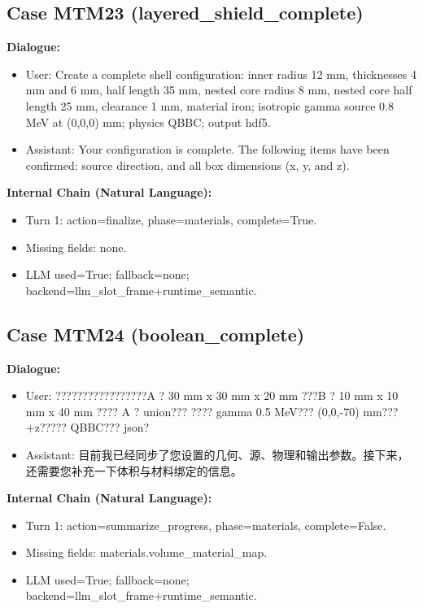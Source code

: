 \documentclass[11pt]{ctexart}
\begin{document}
\subsection{Case MTM23 (layered\_shield\_complete)}
\textbf{Dialogue:}
\begin{itemize}
\item User: Create a complete shell configuration: inner radius 12 mm, thicknesses 4 mm and 6 mm, half length 35 mm, nested core radius 8 mm, nested core half length 25 mm, clearance 1 mm, material iron; isotropic gamma source 0.8 MeV at (0,0,0) mm; physics QBBC; output hdf5.
\item Assistant: Your configuration is complete. The following items have been confirmed: source direction, and all box dimensions (x, y, and z).
\end{itemize}
\textbf{Internal Chain (Natural Language):}
\begin{itemize}
\item Turn 1: action=finalize, phase=materials, complete=True.
\item Missing fields: none.
\item LLM used=True; fallback=none; backend=llm\_slot\_frame+runtime\_semantic.
\end{itemize}
\subsection{Case MTM24 (boolean\_complete)}
\textbf{Dialogue:}
\begin{itemize}
\item User: ?????????????????A ? 30 mm x 30 mm x 20 mm ???B ? 10 mm x 10 mm x 40 mm ???? A ? union??? ???? gamma 0.5 MeV??? (0,0,-70) mm??? +z????? QBBC??? json?
\item Assistant: 目前我已经同步了您设置的几何、源、物理和输出参数。接下来，还需要您补充一下体积与材料绑定的信息。
\end{itemize}
\textbf{Internal Chain (Natural Language):}
\begin{itemize}
\item Turn 1: action=summarize\_progress, phase=materials, complete=False.
\item Missing fields: materials.volume\_material\_map.
\item LLM used=True; fallback=none; backend=llm\_slot\_frame+runtime\_semantic.
\end{itemize}
\end{document}
